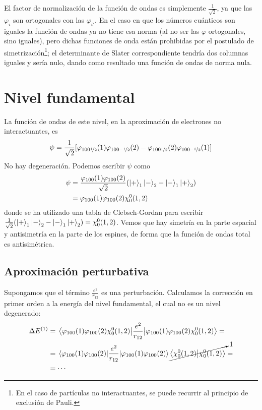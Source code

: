 El factor de normalización de la función de ondas es simplemente
$\frac{1}{\sqrt{2}}$, ya que las $\varphi_i$ son ortogonales con las
$\varphi_{i'}$. En el caso en que los números cuánticos son iguales la
función de ondas ya no tiene esa norma (al no ser las $\varphi$
ortogonales, sino iguales), pero dichas funciones de onda están
prohibidas por el postulado de simetrización\footnote{En el caso de
  partículas no interactuantes, se puede recurrir al principio de
  exclusión de Pauli.}; el determinante de
Slater correspondiente tendría dos columnas iguales y sería nulo,
dando como resultado una función de ondas de norma nula.

\section{Nivel fundamental}
La función de ondas de este nivel, en la aproximación de electrones no
interactuantes, es
\begin{equation}
  \psi = \frac{1}{\sqrt{2}} [\varphi_{100{\nicefrac{1}{2}}}(1) \varphi_{100{\nicefrac{-1}{2}}}(2)
  - \varphi_{100{\nicefrac{1}{2}}}(2) \varphi_{100{\nicefrac{-1}{2}}}(1)]
\end{equation}
No hay degeneración. Podemos escribir $\psi$ como
\begin{equation}
  \begin{split}
    \psi &= \frac{\varphi_{100}(1)\varphi_{100}(2)}{\sqrt{2}}
    ( \ket{+}_1\ket{-}_2 - \ket{-}_1\ket{+}_2 ) \\
    &= \varphi_{100}(1)\varphi_{100}(2) \chi_0^0(1,2)
  \end{split}
\end{equation}
donde se ha utilizado una tabla de Clebsch-Gordan para escribir $
\frac{1}{\sqrt{2}}( \ket{+}_1\ket{-}_2 - \ket{-}_1\ket{+}_2 ) =
\chi_0^0(1,2)$. Vemos que hay simetría en la parte espacial y
antisimetría en la parte de los espines, de forma que la función de
ondas total es antisimétrica.

\subsection{Aproximación perturbativa}
Supongamos que el término $\frac{e^2}{r_{12}}$ es una perturbación.
Calculamos la corrección en primer orden a la energía del nivel
fundamental, el cual no es un nivel degenerado:
\begin{equation}
  \begin{split}
    \Delta E^{(1)} &=
    \ev{\frac{e^2}{r_{12}}}{\varphi_{100}(1)\varphi_{100}(2)\chi_0^0(1,2)} =
    \\
    &=
    \ev{\frac{e^2}{r_{12}}}{\varphi_{100}(1)\varphi_{100}(2)}\cancelto{1}{\ip{\chi_0^0(1,2)}}
    =\\ &=\cdots
  \end{split}
\end{equation}

